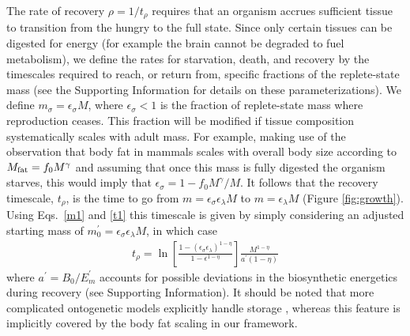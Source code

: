 \documentclass{pnastwo}
\begin{document}
\begin{article}
The rate of recovery $\rho = 1/t_\rho$ requires that an organism accrues
sufficient tissue to transition from the hungry to the full state.  Since
only certain tissues can be digested for energy (for example the brain cannot
be degraded to fuel metabolism), we define the rates for starvation, death,
and recovery by the timescales required to reach, or return from, specific
fractions of the replete-state mass (see the Supporting Information for details on these parameterizations).  We define
$m_{\sigma}=\epsilon_{\sigma} M$, where $\epsilon_{\sigma}<1$ is the fraction of
replete-state mass where reproduction ceases. This fraction will be modified
if tissue composition systematically scales with adult mass.  For example,
making use of the observation that body fat in mammals scales with overall
body size according to $M_{\rm fat}=f_{0}M^{\gamma}$ and assuming that once
this mass is fully digested the organism starves, this would imply that
$\epsilon_{\sigma}=1-f_{0}M^{\gamma}/M$. It follows that the
recovery timescale, $t_{\rho}$, is the time to go from
$m=\epsilon_{\sigma} \epsilon_{\lambda} M$ to $m=\epsilon_{\lambda}M$ (Figure \ref{fig:growth}). Using Eqs.~\eqref{m1} and \eqref{t1} this timescale is given by simply considering an adjusted starting mass of $m_{0}^{\prime}=\epsilon_{\sigma}\epsilon_{\lambda}M$, in which case
\begin{eqnarray}
t_{\rho}=\ln\left[\frac{1-\left(\epsilon_{\sigma}\epsilon_{\lambda}\right)^{1-\eta}}{1-\epsilon^{1-\eta}}\right]\frac{M^{1-\eta}}{a^{\prime}\left(1-\eta\right)}
\end{eqnarray}
where $a^{\prime}=B_{0}/E_{m}^{\prime}$ accounts for possible deviations in the biosynthetic energetics during recovery (see Supporting Information). It should be noted that more complicated ontogenetic models explicitly handle
storage \cite{hou}, whereas this feature is implicitly covered by the body
fat scaling in our framework.


\end{article}
\end{document}
